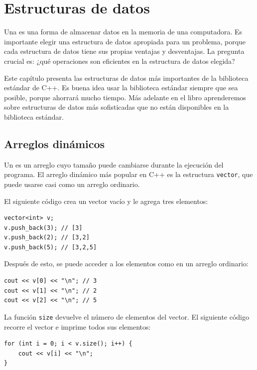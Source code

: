 \chapter{Estructuras de datos}


Una  es una forma de almacenar
datos en la memoria de una computadora.
Es importante elegir una estructura de datos
apropiada para un problema,
porque cada estructura de datos tiene sus propias
ventajas y desventajas.
La pregunta crucial es: ¿qué operaciones
son eficientes en la estructura de datos elegida?

Este capítulo presenta las estructuras de datos
más importantes de la biblioteca estándar de C++.
Es buena idea usar la biblioteca estándar
siempre que sea posible,
porque ahorrará mucho tiempo.
Más adelante en el libro aprenderemos sobre estructuras
de datos más sofisticadas que no están disponibles
en la biblioteca estándar.

\section{Arreglos dinámicos}


Un  es un arreglo cuyo
tamaño puede cambiarse durante la ejecución
del programa.
El arreglo dinámico más popular en C++ es
la estructura \texttt{vector},
que puede usarse casi como un arreglo ordinario.

El siguiente código crea un vector vacío y
le agrega tres elementos:

\begin{lstlisting}
vector<int> v;
v.push_back(3); // [3]
v.push_back(2); // [3,2]
v.push_back(5); // [3,2,5]
\end{lstlisting}

Después de esto, se puede acceder a los elementos como en un arreglo ordinario:

\begin{lstlisting}
cout << v[0] << "\n"; // 3
cout << v[1] << "\n"; // 2
cout << v[2] << "\n"; // 5
\end{lstlisting}

La función \texttt{size} devuelve el número de elementos del vector.
El siguiente código recorre
el vector e imprime todos sus elementos:

\begin{lstlisting}
for (int i = 0; i < v.size(); i++) {
    cout << v[i] << "\n";
}
\end{lstlisting}

